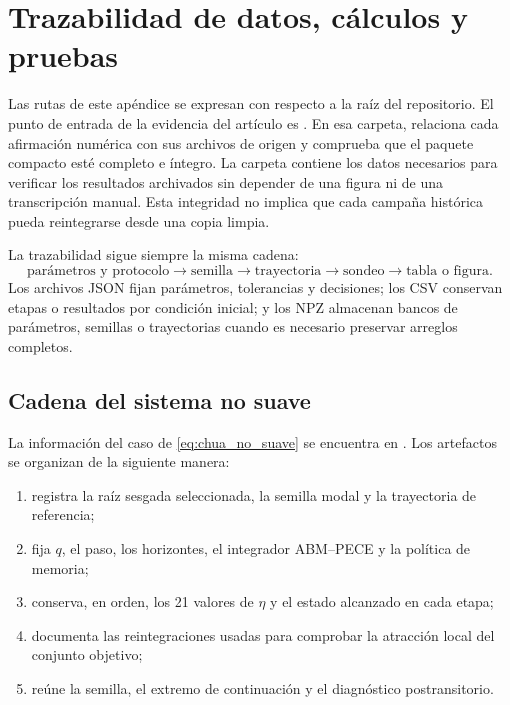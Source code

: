 \section{Trazabilidad de datos, cálculos y pruebas}
\label{app:trazabilidad}

Las rutas de este apéndice se expresan con respecto a la raíz del repositorio.
El punto de entrada de la evidencia del artículo es
. En esa carpeta,
 relaciona cada afirmación numérica con sus archivos
de origen y  comprueba que el paquete
compacto esté completo e íntegro. La carpeta
 contiene los datos necesarios para verificar los resultados
archivados sin depender de una figura ni de una transcripción manual. Esta
integridad no implica que cada campaña histórica pueda reintegrarse desde una
copia limpia.

La trazabilidad sigue siempre la misma cadena:
\[
\text{parámetros y protocolo}
\longrightarrow
\text{semilla}
\longrightarrow
\text{trayectoria}
\longrightarrow
\text{sondeo}
\longrightarrow
\text{tabla o figura}.
\]
Los archivos JSON fijan parámetros, tolerancias y decisiones; los CSV
conservan etapas o resultados por condición inicial; y los NPZ almacenan
bancos de parámetros, semillas o trayectorias cuando es necesario preservar
arreglos completos.

\subsection{Cadena del sistema no suave}

La información del caso de \cref{eq:chua_no_suave} se encuentra en
.
Los artefactos se organizan de la siguiente manera:

\begin{enumerate}
  \item {} registra la raíz sesgada
  seleccionada, la semilla modal y la trayectoria de referencia;
  \item {} fija \(q\), el paso, los
  horizontes, el integrador ABM--PECE y la política de memoria;
  \item {} conserva, en orden, los 21 valores
  de \(\eta\) y el estado alcanzado en cada etapa;
  \item {} documenta las reintegraciones
  usadas para comprobar la atracción local del conjunto objetivo;
  \item {} reúne la semilla, el extremo de continuación y
  el diagnóstico postransitorio.
\end{enumerate}

